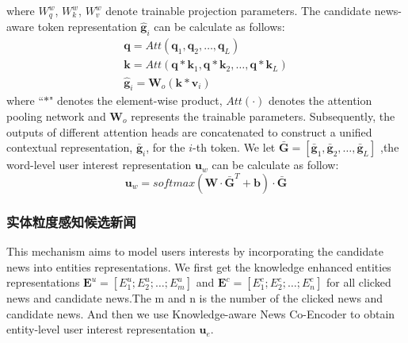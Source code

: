 \documentclass[withoutpreface,bwprint]{cumcmthesis} %
\begin{document}
	where $W^w_q $, $W^w_k$, $W^w_v$ denote trainable projection parameters. The candidate news-aware token representation $\hat{\mathbf{g}}_i$ can be calculate as follows:
	\begin{equation}\label{wcan}
	\begin{split}
	\mathbf{q} = Att(\mathbf{q}_1, \mathbf{q}_2, \dots, \mathbf{q}_L)\\
	\mathbf{k} = Att(\mathbf{q} * \mathbf{k}_1, \mathbf{q} * \mathbf{k}_2, \dots, \mathbf{q} * \mathbf{k}_L)\\
	\hat{\mathbf{g}}_i = \mathbf{W}_o(\mathbf{k} * \mathbf{v}_i)
	\end{split}
	\end{equation}
	where ``$*$" denotes the element-wise product, $Att(\cdot)$ denotes the attention pooling network and $\mathbf{W}_o$ represents the trainable parameters. 
	Subsequently, the outputs of different attention heads are concatenated to construct a unified contextual representation, $\bar{\mathbf{g}}_i$, for the $i$-th token. We let $\bar{\mathbf{G}}= [\bar{\mathbf{g}}_1,\bar{\mathbf{g}}_2, \ldots,  \bar{\mathbf{g}} _L]$
	,the word-level user interest representation $\mathbf{u}_w$ can be calculate as follow:
	\begin{equation}
	\mathbf{u} _w = softmax( \mathbf{W} \cdot \mathbf{\bar{G}}^{T} + \mathbf{b}) \cdot \mathbf{\bar{G}}
	\end{equation}
	\subsubsection{ 实体粒度感知候选新闻}
	This mechanism aims to model users interests by incorporating the candidate news into entities representations. We first get the knowledge enhanced entities representations $\mathbf{E}^{u} = [E^u_1;E^u_2;\dots;E^u_m] $ and $\mathbf{E}^{c} = [E^c_1;E^c_2;\dots;E^c_n] $ for all clicked news and candidate news.The m and n is the number of the clicked news and candidate news. And then we use Knowledge-aware News Co-Encoder to obtain entity-level user interest representation $\mathbf{u}_e $.
\end{document}
